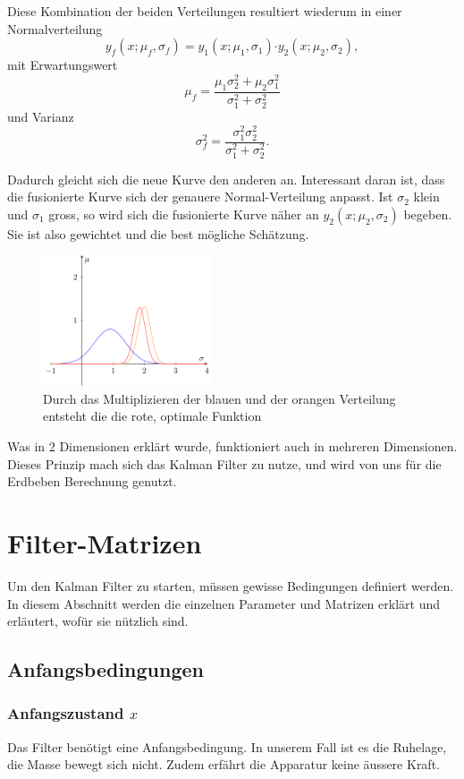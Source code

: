 Diese Kombination der beiden Verteilungen resultiert wiederum in einer Normalverteilung
\[ {y_f}(x; {\mu_f}, {\sigma_f}) = {y_1}(x;{ \mu_1},{ \sigma_1}) {\cdot y_2}(x; {\mu_2}, {\sigma_2}), \]
mit Erwartungswert
\[ \mu_f = \frac{\mu_1\sigma_2^2 + \mu_2 \sigma_1^2}{\sigma_1^2 + \sigma_2^2} \]
und Varianz
\[ \sigma_f^2 = \frac{\sigma_1^2 \sigma_2^2}{\sigma_1^2 + \sigma_2^2}. \]

Dadurch gleicht sich die neue Kurve den anderen an. Interessant daran ist, dass die fusionierte Kurve sich der genauere Normal-Verteilung anpasst.
Ist ${\sigma_2}$ klein und ${\sigma_1}$ gross, so wird sich die fusionierte Kurve näher an ${y_2}(x;{\mu_2},{\sigma_2})$ begeben.
Sie ist also gewichtet und die best mögliche Schätzung. 


\begin{figure}
 \begin{center}
 \includegraphics[width=5cm]{papers/erdbeben/Gausskurve3.pdf}
 \caption{Durch das Multiplizieren der blauen und der orangen Verteilung entsteht die die rote, optimale Funktion}
 \end{center}
\end{figure}


Was in 2 Dimensionen erklärt wurde, funktioniert auch in mehreren Dimensionen. 
Dieses Prinzip mach sich das Kalman Filter zu nutze, und wird von uns für die Erdbeben Berechnung genutzt. 

\section{Filter-Matrizen}
Um den Kalman Filter zu starten, müssen gewisse Bedingungen definiert werden. 
In diesem Abschnitt werden die einzelnen Parameter und Matrizen erklärt und erläutert, wofür sie nützlich sind. 

\subsection{Anfangsbedingungen}
\subsubsection*{Anfangszustand $x$}
Das Filter benötigt eine Anfangsbedingung. 
In unserem Fall ist es die Ruhelage, die Masse bewegt sich nicht. 
Zudem erfährt die Apparatur keine äussere Kraft.


